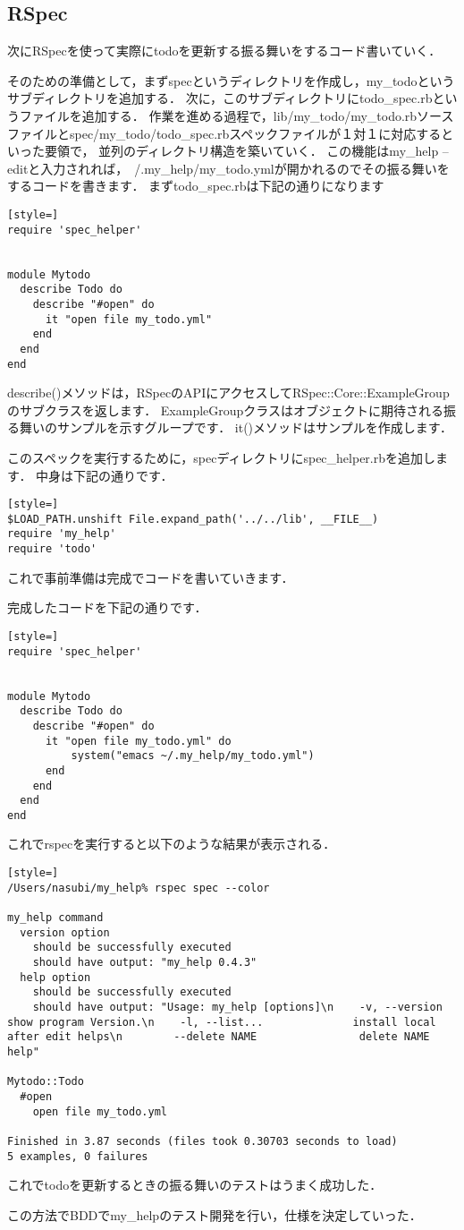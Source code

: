 \subsection{RSpec}
次にRSpecを使って実際にtodoを更新する振る舞いをするコード書いていく．

そのための準備として，まずspecというディレクトリを作成し，my\_todoというサブディレクトリを追加する．
次に，このサブディレクトリにtodo\_spec.rbというファイルを追加する．
作業を進める過程で，lib/my\_todo/my\_todo.rbソースファイルとspec/my\_todo/todo\_spec.rbスペックファイルが１対１に対応するといった要領で，
並列のディレクトリ構造を築いていく．
この機能はmy\_help --editと入力されれば，~/.my\_help/my\_todo.ymlが開かれるのでその振る舞いをするコードを書きます．
まずtodo\_spec.rbは下記の通りになります
\begin{lstlisting}[style=]
require 'spec_helper'


module Mytodo
  describe Todo do
    describe "#open" do
      it "open file my_todo.yml" 
    end
  end
end

\end{lstlisting}
describe()メソッドは，RSpecのAPIにアクセスしてRSpec::Core::ExampleGroupのサブクラスを返します．
ExampleGroupクラスはオブジェクトに期待される振る舞いのサンプルを示すグループです．
it()メソッドはサンプルを作成します．

このスペックを実行するために，specディレクトリにspec\_helper.rbを追加します．
中身は下記の通りです．
\begin{lstlisting}[style=]
$LOAD_PATH.unshift File.expand_path('../../lib', __FILE__)
require 'my_help'
require 'todo'
\end{lstlisting}
これで事前準備は完成でコードを書いていきます．

完成したコードを下記の通りです．
\begin{lstlisting}[style=]
require 'spec_helper'


module Mytodo
  describe Todo do
    describe "#open" do
      it "open file my_todo.yml" do
          system("emacs ~/.my_help/my_todo.yml")
      end
    end
  end
end

\end{lstlisting}
これでrspecを実行すると以下のような結果が表示される．
\begin{lstlisting}[style=]
/Users/nasubi/my_help% rspec spec --color

my_help command
  version option
    should be successfully executed
    should have output: "my_help 0.4.3"
  help option
    should be successfully executed
    should have output: "Usage: my_help [options]\n    -v, --version                    show program Version.\n    -l, --list...              install local after edit helps\n        --delete NAME                delete NAME help"

Mytodo::Todo
  #open
    open file my_todo.yml

Finished in 3.87 seconds (files took 0.30703 seconds to load)
5 examples, 0 failures

\end{lstlisting}
これでtodoを更新するときの振る舞いのテストはうまく成功した．

この方法でBDDでmy\_helpのテスト開発を行い，仕様を決定していった．


